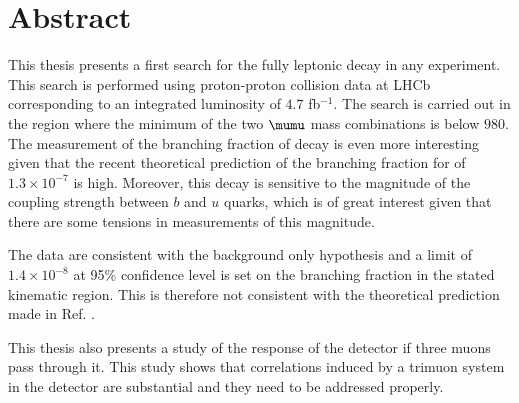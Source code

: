 \chapter*{Abstract}
\noindent
This thesis presents a first search for the fully leptonic decay \Bmumumu in any experiment. This search is performed using
proton-proton collision data at LHCb corresponding to an integrated luminosity of $4.7$ fb$^{-1}$. The search is carried out in the
region where the minimum of the two $\mumu$ mass combinations is below $980$\mevcc. The measurement of the branching fraction of decay is even more interesting given that the recent theoretical prediction \cite{Danilina:2018uzr} of the branching fraction for \Bmumumu of $1.3 \times 10^{-7}$ is high. Moreover, this decay is sensitive to the magnitude of the coupling strength between $b$ and $u$ quarks, which is of great interest given that there are some tensions in measurements of this magnitude.

The data are consistent with the background only hypothesis and a limit of $1.4 \times 10^{-8}$ at 95\% confidence level is set on the branching fraction in the stated kinematic region. This is therefore not consistent with the theoretical prediction made in Ref. \cite{Danilina:2018uzr}.

This thesis also presents a study of the response of the detector if three muons pass through it. This study shows that correlations induced by a trimuon system in the detector are substantial and they need to be addressed properly.



